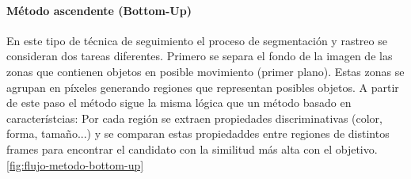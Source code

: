     \paragraph*{Método ascendente (Bottom-Up)}
    En este tipo de técnica de seguimiento el proceso de segmentación y rastreo se consideran dos tareas diferentes. Primero se separa el fondo de la imagen de las zonas que contienen objetos en posible movimiento (primer plano). Estas zonas se agrupan en píxeles generando regiones que representan posibles objetos. A partir de este paso el método sigue la misma lógica que un método basado en característcias: Por cada región se extraen propiedades discriminativas (color, forma, tamaño...) y se comparan estas propiedaddes entre regiones de distintos frames para encontrar el candidato con la similitud más alta con el objetivo. \ref{fig:flujo-metodo-bottom-up}


